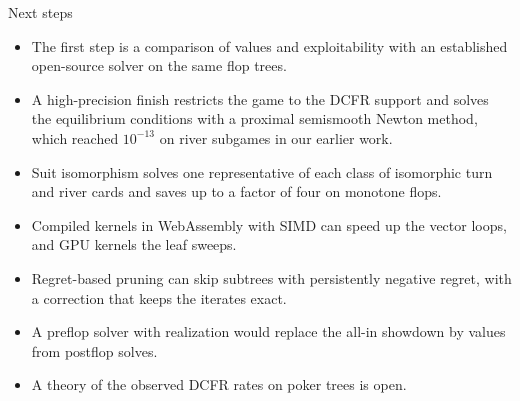\documentclass[10pt,aspectratio=169]{beamer}
\begin{document}
\begin{frame}{Next steps}
\begin{itemize}[<+->]\setlength\itemsep{2pt}\small
\item The first step is a comparison of values and exploitability with an established open-source solver on the same flop
trees.
\item A high-precision finish restricts the game to the DCFR support and solves the equilibrium conditions with a
proximal semismooth Newton method, which reached $10^{-13}$ on river subgames in our earlier work.
\item Suit isomorphism solves one representative of each class of isomorphic turn and river cards and saves up to a
factor of four on monotone flops.
\item Compiled kernels in WebAssembly with SIMD can speed up the vector loops, and GPU kernels the leaf sweeps.
\item Regret-based pruning can skip subtrees with persistently negative regret, with a correction that keeps the
iterates exact.
\item A preflop solver with realization would replace the all-in showdown by values from postflop solves.
\item A theory of the observed DCFR rates on poker trees is open.
\end{itemize}
\end{frame}
\end{document}
